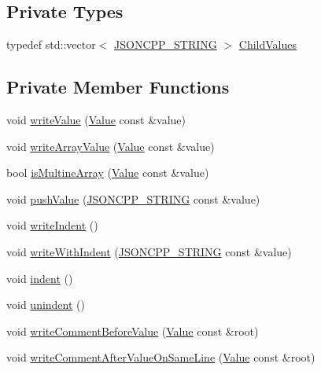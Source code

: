 \subsection*{Private Types}
\begin{DoxyCompactItemize}
\item 
typedef std\+::vector$<$ \hyperlink{json_8h_a1e723f95759de062585bc4a8fd3fa4be}{J\+S\+O\+N\+C\+P\+P\+\_\+\+S\+T\+R\+I\+NG} $>$ \hyperlink{struct_json_1_1_built_styled_stream_writer_a63196b38400e5ce452f65ce856d47b6f}{Child\+Values}
\end{DoxyCompactItemize}
\subsection*{Private Member Functions}
\begin{DoxyCompactItemize}
\item 
void \hyperlink{struct_json_1_1_built_styled_stream_writer_a7c9da861861e570a51b45f270c9ff150}{write\+Value} (\hyperlink{class_json_1_1_value}{Value} const \&value)
\item 
void \hyperlink{struct_json_1_1_built_styled_stream_writer_acd20e9274bbcf7876ef3af2e7d23a31f}{write\+Array\+Value} (\hyperlink{class_json_1_1_value}{Value} const \&value)
\item 
bool \hyperlink{struct_json_1_1_built_styled_stream_writer_af423fd33b3d580506ea3efc53b05a077}{is\+Multine\+Array} (\hyperlink{class_json_1_1_value}{Value} const \&value)
\item 
void \hyperlink{struct_json_1_1_built_styled_stream_writer_a91e8535508412eea04d77c0cafdf15aa}{push\+Value} (\hyperlink{json_8h_a1e723f95759de062585bc4a8fd3fa4be}{J\+S\+O\+N\+C\+P\+P\+\_\+\+S\+T\+R\+I\+NG} const \&value)
\item 
void \hyperlink{struct_json_1_1_built_styled_stream_writer_a2b38a3714d415c4bd3b4812897130f3d}{write\+Indent} ()
\item 
void \hyperlink{struct_json_1_1_built_styled_stream_writer_a6e80e1a0d5f64df2ec48c3c3b1284990}{write\+With\+Indent} (\hyperlink{json_8h_a1e723f95759de062585bc4a8fd3fa4be}{J\+S\+O\+N\+C\+P\+P\+\_\+\+S\+T\+R\+I\+NG} const \&value)
\item 
void \hyperlink{struct_json_1_1_built_styled_stream_writer_a73e09692a2cfbd6e67836b060dc34a9f}{indent} ()
\item 
void \hyperlink{struct_json_1_1_built_styled_stream_writer_a0da6c6f603e00c8c6e38af553edd8c55}{unindent} ()
\item 
void \hyperlink{struct_json_1_1_built_styled_stream_writer_a32c4afca4e08fba79bb0a80a8010283a}{write\+Comment\+Before\+Value} (\hyperlink{class_json_1_1_value}{Value} const \&root)
\item 
void \hyperlink{struct_json_1_1_built_styled_stream_writer_a89625b134fce0255263ca40e6125742b}{write\+Comment\+After\+Value\+On\+Same\+Line} (\hyperlink{class_json_1_1_value}{Value} const \&root)
\end{DoxyCompactItemize}
